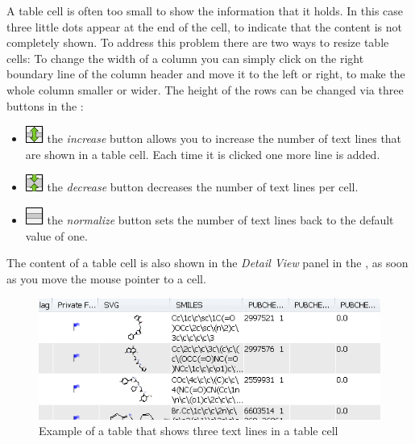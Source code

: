 A table cell is often too small to show the information that it holds.
In this case three little dots appear at the end of the cell, to indicate
that the content is not completely shown. To address this problem there
are two ways to resize table cells: To change the width of a column
you can simply click on the right boundary line of the column header
and move it to the left or right, to make the whole column smaller
or wider. The height of the rows can be changed via three buttons
in the \tbar:
\begin{itemize}
\item \includegraphics{images/table/table_lines_enlarge} the
\textit{increase} button allows you to increase the number of text lines
that are shown in a table cell. Each time it is clicked one more line
is added.
\item \includegraphics{images/table/table_lines_shrink} the
\textit{decrease} button decreases the number of text lines per cell. 
\item \includegraphics{images/table/table_lines_normalize} the
\textit{normalize} button sets the number of text lines back to the
default value of one.
\end{itemize}
The content of a table cell is also shown in the \textit{Detail View}
panel in the \sbar, as soon as you move the mouse pointer to a cell.

%
\begin{figure}[!htb]
\begin{centering}
\includegraphics[width=0.8\columnwidth]{images/table/table_rowheight_example}
\par\end{centering}

\caption[Enlarged table rows]{Example of a table that shows three text lines in a table cell}


%
\end{figure}



